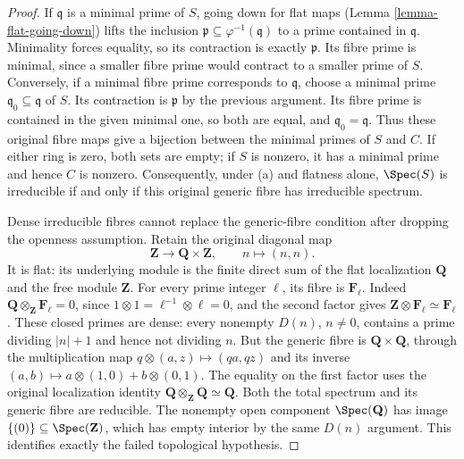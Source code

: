 \begin{proof}
If $\mathfrak q$ is a minimal
prime of $S$, going down for
flat maps (Lemma \ref{lemma-flat-going-down}) lifts the inclusion
$\mathfrak p\subseteq\varphi^{-1}(\mathfrak q)$
to a prime contained in
$\mathfrak q$. Minimality forces
equality, so its contraction is
exactly $\mathfrak p$. Its fibre
prime is minimal, since a smaller
fibre prime would contract to
a smaller prime of $S$.
Conversely, if a minimal fibre
prime corresponds to $\mathfrak q$,
choose a minimal prime
$\mathfrak q_0\subseteq\mathfrak q$
of $S$. Its contraction is
$\mathfrak p$ by the previous
argument. Its fibre prime is
contained in the given minimal
one, so both are equal, and
$\mathfrak q_0=\mathfrak q$.
Thus these original fibre maps
give a bijection between the
minimal primes of $S$ and $C$.
If either ring is zero, both
sets are empty; if $S$ is nonzero,
it has a minimal prime and hence
$C$ is nonzero. Consequently,
under (a) and flatness alone,
$\Spec(S)$ is irreducible if and
only if this original generic
fibre has irreducible spectrum.

Dense irreducible fibres cannot
replace the generic-fibre condition
after dropping the openness
assumption. Retain the original
diagonal map
$$
\mathbf Z\longrightarrow\mathbf Q\times\mathbf Z,
\qquad n\longmapsto(n,n).
$$
It is flat: its underlying module
is the finite direct sum of the
flat localization $\mathbf Q$
and the free module $\mathbf Z$.
For every prime integer $\ell$,
its fibre is $\mathbf F_\ell$.
Indeed $\mathbf Q\otimes_{\mathbf Z}\mathbf F_\ell=0$,
since $1\otimes1=\ell^{-1}\otimes\ell=0$,
and the second factor gives
$\mathbf Z\otimes\mathbf F_\ell\simeq\mathbf F_\ell$.
These closed primes are dense:
every nonempty $D(n)$, $n\neq0$,
contains a prime dividing $|n|+1$
and hence not dividing $n$.
But the generic fibre is
$\mathbf Q\times\mathbf Q$,
through the multiplication map
$q\otimes(a,z)\mapsto(qa,qz)$
and its inverse
$(a,b)\mapsto a\otimes(1,0)+b\otimes(0,1)$.
The equality on the first factor
uses the original localization
identity $\mathbf Q\otimes_{\mathbf Z}\mathbf Q\simeq\mathbf Q$.
Both the total spectrum and its
generic fibre are reducible.
The nonempty open component
$\Spec(\mathbf Q)$ has image
$\{(0)\}\subseteq\Spec(\mathbf Z)$,
which has empty interior by the
same $D(n)$ argument. This
identifies exactly the failed
topological hypothesis.
\end{proof}